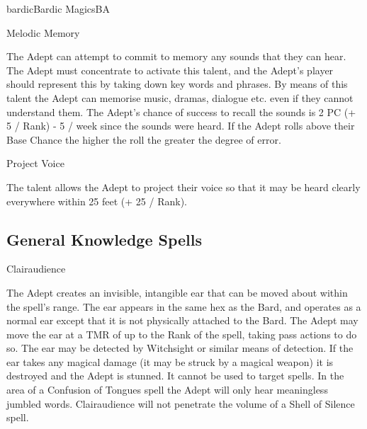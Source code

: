 \begin{college}[2.1]{bardic}{Bardic Magics}{BA}
\begin{talent}[T-3]{Melodic Memory}

\begin{effects}
The Adept can attempt to commit to memory any sounds that they can
hear. The Adept must concentrate to activate this talent, and the
Adept's player should represent this by taking down key words and
phrases. By means of this talent the Adept can memorise music, dramas,
dialogue etc. even if they cannot understand them. The Adept's chance
of success to recall the sounds is 2 \x PC (+ 5 / Rank) - 5 / week
since the sounds were heard. If the Adept rolls above their Base
Chance the higher the roll the greater the degree of error.
\end{effects}
\end{talent}

\begin{talent}[T-4]{Project Voice}

\begin{effects}
The talent allows the Adept to project their voice so that it may be
heard clearly everywhere within 25 feet (+ 25 / Rank).
\end{effects}
\end{talent}

\subsection{General Knowledge Spells}

\begin{spell}[G-1]{Clairaudience}

\begin{effects}
The Adept creates an invisible, intangible ear that can be moved about
within the spell's range.  The ear appears in the same hex as the
Bard, and operates as a normal ear except that it is not physically
attached to the Bard. The Adept may move the ear at a TMR of up to the
Rank of the spell, taking pass actions to do so. The ear may be
detected by Witchsight or similar means of detection. If the ear takes
any magical damage (it may be struck by a magical weapon) it is
destroyed and the Adept is stunned. It cannot be used to target
spells. In the area of a Confusion of Tongues spell the Adept will
only hear meaningless jumbled words. Clairaudience will not penetrate
the volume of a Shell of Silence spell.
\end{effects}
\end{spell}


\end{college}
